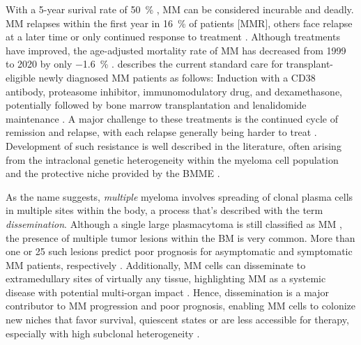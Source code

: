 With a 5-year surival rate of \SI{50}{\percent}
\cite{turessonRapidlyChangingMyeloma2018}, \ac{MM} can be considered incurable
and deadly. \ac{MM} relapses within the first year in \SI{16}{\percent} of
patients [\ac{MMR}], others face relapse at a later time or only continued
response to treatment \cite{majithiaEarlyRelapseFollowing2016}. Although
treatments have improved, the age-adjusted mortality rate of \ac{MM} has
decreased from 1999 to 2020 by only \SI{-1.6}{\percent}
\cite{doddiDisparitiesMultipleMyeloma2024}.
\citet{engelhardtFunctionalCureLongterm2024} describes the current standard care
for transplant-eligible newly diagnosed \ac{MM} patients as follows: Induction
with a CD38 antibody, proteasome inhibitor, immunomodulatory drug, and
dexamethasone, potentially followed by bone marrow transplantation and
lenalidomide maintenance \cite{rajkumarMultipleMyelomaCurrent2020}. A major
challenge to these treatments is the continued cycle of remission and relapse,
with each relapse generally being harder to treat
\cite{podarRelapsedRefractoryMultiple2021}. Development of such resistance is
well described in the literature, often arising from the intraclonal genetic
heterogeneity within the myeloma cell population and the protective niche
provided by the \ac{BMME}
\cite{solimandoDrugResistanceMultiple2022}.



%
\label{sec:intro_myeloma_dissemination}%
As the name suggests, \emph{multiple} myeloma involves spreading of clonal
plasma cells in multiple sites within the body, a process that's described with
the term \emph{dissemination}. Although a single large plasmacytoma is still
classified as \ac{MM} \cite{rajkumarInternationalMyelomaWorking2014}, the
presence of multiple tumor lesions within the \ac{BM} is very common. More than
one or 25 such lesions predict poor prognosis for asymptomatic and symptomatic
\ac{MM} patients, respectively \cite{kastritisPrognosticImportancePresence2014,
    maiMagneticResonanceImagingbased2015a}. Additionally, \ac{MM} cells can
disseminate to extramedullary sites of virtually any tissue, highlighting
\ac{MM} as a systemic disease with potential multi-organ impact
\cite{rajkumarMultipleMyelomaCurrent2020,
    bladeExtramedullaryDiseaseMultiple2022}. Hence, dissemination is a major
contributor to \ac{MM} progression and poor prognosis, enabling \ac{MM} cells to
colonize new niches that favor survival, quiescent states or are less accessible
for therapy, especially with high subclonal heterogeneity
\cite{forsterMolecularImpactTumor2022,keatsClonalCompetitionAlternating2012}.

